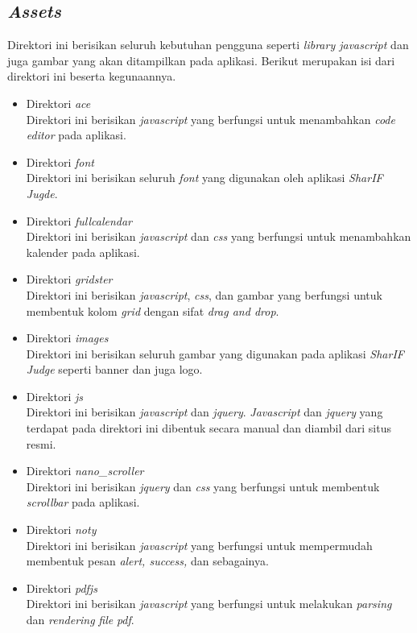 \subsection{\textit{Assets}}
Direktori ini berisikan seluruh kebutuhan pengguna seperti \textit{library javascript} dan juga gambar yang akan ditampilkan pada aplikasi. Berikut merupakan isi dari direktori ini beserta kegunaannya.
\begin{itemize}
	\item Direktori \textit{ace} \\ Direktori ini berisikan \textit{javascript} yang berfungsi untuk menambahkan \textit{code editor} pada aplikasi.
	\item Direktori \textit{font} \\Direktori ini berisikan seluruh \textit{font} yang digunakan oleh aplikasi \textit{SharIF Jugde}.
	\item Direktori \textit{fullcalendar} \\Direktori ini berisikan \textit{javascript} dan \textit{css} yang berfungsi untuk menambahkan kalender pada aplikasi.
	\item Direktori \textit{gridster} \\Direktori ini berisikan \textit{javascript}, \textit{css}, dan gambar yang berfungsi untuk membentuk kolom \textit{grid} dengan sifat \textit{drag and drop}.
	\item Direktori \textit{images} \\Direktori ini berisikan seluruh gambar yang digunakan pada aplikasi \textit{SharIF Judge} seperti banner dan juga logo.
	\item Direktori \textit{js} \\Direktori ini berisikan \textit{javascript} dan \textit{jquery}. \textit{Javascript} dan \textit{jquery} yang terdapat pada direktori ini dibentuk secara manual dan diambil dari situs resmi.
	\item Direktori \textit{nano\_scroller} \\Direktori ini berisikan \textit{jquery} dan \textit{css} yang berfungsi untuk membentuk \textit{scrollbar} pada aplikasi.
	\item Direktori \textit{noty} \\Direktori ini berisikan \textit{javascript} yang berfungsi untuk mempermudah membentuk pesan \textit{alert, success,} dan sebagainya.
	\item Direktori \textit{pdfjs} \\Direktori ini berisikan \textit{javascript} yang berfungsi untuk melakukan \textit{parsing} dan \textit{rendering} \textit{file} \textit{pdf}.

\end{itemize}
